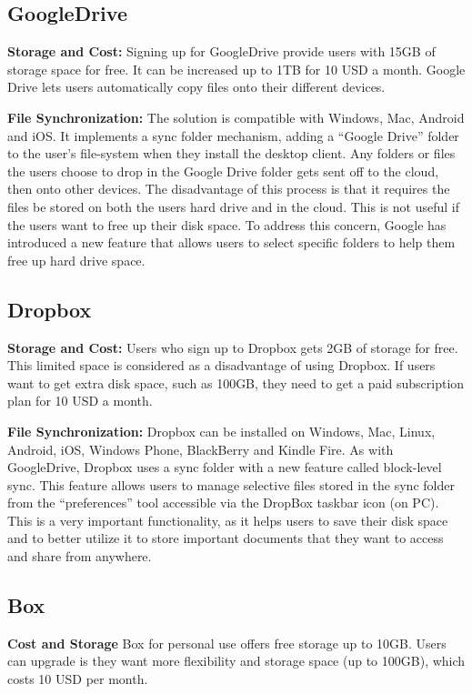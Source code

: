 \documentclass{article}
\begin{document}
\subsection{GoogleDrive}
\textbf{Storage and Cost:}
Signing up for GoogleDrive provide users with 15GB of storage space for free. It can be increased up to 1TB for 10 USD a month. Google Drive lets users automatically copy files onto their different devices.


\hfill \break %
\textbf{File Synchronization:}
The solution is compatible with Windows, Mac, Android and iOS. It implements a sync folder mechanism, adding a “Google Drive” folder to the user's file-system when they install the desktop client. Any folders or files the users choose to drop in the Google Drive folder gets sent off to the cloud, then onto other devices. The disadvantage of this process is that it requires the files be stored on both the users hard drive and in the cloud. This is not useful if the users want to free up their disk space. To address this concern, Google has introduced a new feature that allows users to select specific folders to help them free up hard drive space.

\subsection{Dropbox}
\textbf{Storage and Cost:}
Users who sign up to Dropbox gets 2GB of storage for free. This limited space is considered as a disadvantage of using Dropbox. If users want to get extra disk space, such as 100GB, they need to get a paid subscription plan for 10 USD a month.


\hfill \break
\textbf{File Synchronization:}
Dropbox can be installed on Windows, Mac, Linux, Android, iOS, Windows Phone, BlackBerry and Kindle Fire. As with GoogleDrive, Dropbox uses a sync folder with a new feature called block-level sync. This feature allows users to manage selective files stored in the sync folder from the “preferences” tool accessible via the DropBox taskbar icon (on PC). This is a very important functionality, as it helps users to save their disk space and to better utilize it to store important documents that they want to access and share from anywhere.


\subsection{Box}
\textbf{Cost and Storage}
Box for personal use offers free storage up to 10GB. Users can upgrade is they want  more flexibility and storage space (up to 100GB), which costs 10 USD per month.
\end{document}
